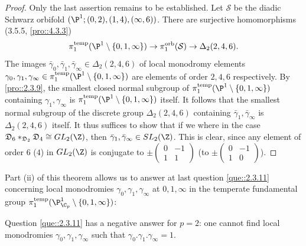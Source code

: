 \begin{proof}
 Only the last assertion remains to be established. Let $\mathcal{S}$ be 
 the diadic Schwarz orbifold
 $(\P^1;(0,2),(1,4),(\infty,6))$.  There are surjective homomorphisms 
 (3.5.5, \ref{pro::4.3.3})
 \begin{equation*}
  \pi_1^{\mathrm{temp}}(\P^1\setminus
   \{0,1,\infty\})\to
   \pi_1^{\mathrm{orb}}(\mathcal{S})\to \Delta_2(2,4,6).
 \end{equation*} 
 The images 
 $\bar\gamma_0,\bar\gamma_1,\bar\gamma_\infty\in  \Delta_2(2,4,6)$
 of local monodromy elements $\gamma_0,\gamma_1,\gamma_\infty \in 
 \pi_1^{\mathrm{temp}}(\P^1\setminus
 \{0,1,\infty\})$ are elements of order $2,4,6$ respectively. By 
 \ref{pro::2.3.9}, the smallest closed normal
 subgroup of $\pi_1^{\mathrm{temp}}(\P^1\setminus
 \{0,1,\infty\})$ containing $\gamma_1,\gamma_\infty$ is 
 $\pi_1^{\mathrm{temp}}(\P^1\setminus
 \{0,1,\infty\})$ itself. It follows that the smallest normal
 subgroup of the discrete group $\Delta_2(2,4,6)$ containing 
 $\bar\gamma_1,\bar\gamma_\infty$ is $\Delta_2(2,4,6)$ itself.
 It thus suffices to show that if we where in the case $\mathfrak{D}_6 
 \ast_{\mathfrak{D}_2}\mathfrak{D}_4\cong
 GL_2(\Z)$, then $\bar\gamma_1,\bar\gamma_\infty\in SL_2(\Z)$. This is 
 clear, since any element of order $6$ (\resp $4$) in $ GL_2(\Z)$ is
 conjugate to $\pm
 \begin{pmatrix}
  0 & -1 \\ 1& 1
 \end{pmatrix}$
 (\resp to
 $\pm\begin{pmatrix}
      0& -1 \\ 1& 0
     \end{pmatrix}$).
\end{proof}

\medskip Part (ii) of this theorem allows us to answer at last 
question \ref{que::2.3.11} concerning
local monodromies $\gamma_0,\gamma_1,\gamma_\infty$ at $0,1,\infty$ 
in the temperate fundamental group
$\pi_1^{\mathrm{temp}}(\P^1_{\C_p}\setminus \{0,1,\infty\})$:

\begin{cor}\label{cor::6.4.6} Question \ref{que::2.3.11} has a negative
 answer for $p=2$: one cannot find local monodromies
 $\gamma_0,\gamma_1,\gamma_\infty$ such that 
 $\gamma_0.\gamma_1.\gamma_\infty = 1$.
\end{cor}

